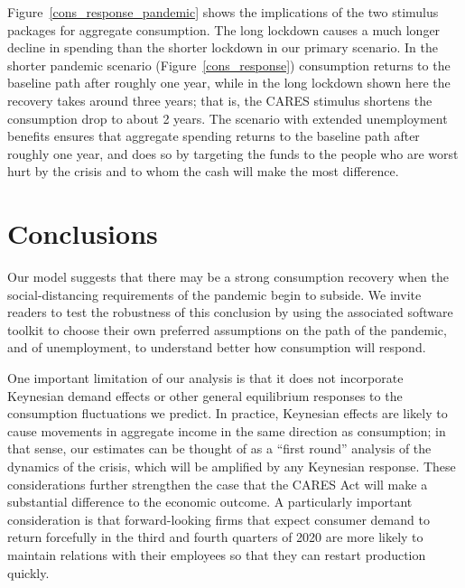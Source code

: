 \documentclass[titlepage]{\econtex}
\begin{document}
Figure~\ref{cons_response_pandemic} shows the implications of the two stimulus packages for aggregate consumption. 
The long lockdown causes a much longer decline in spending than the shorter lockdown in our primary scenario. In the shorter pandemic scenario (Figure~\ref{cons_response}) consumption returns to the baseline path after roughly one year, while in the long lockdown shown here the recovery takes around three years; that is,
the CARES stimulus shortens the consumption drop to about 2 years.
The scenario with extended unemployment benefits ensures that aggregate spending returns to the baseline path after roughly one year, and does so by targeting the funds to the people who are worst hurt by the crisis and to whom the cash will make the most difference.  

\section{Conclusions}

Our model suggests that there may be a strong consumption recovery when the social-distancing requirements of the pandemic begin to subside.
We invite readers to test the robustness of this conclusion by using the associated software toolkit to choose their own preferred assumptions on the path of the pandemic, and of unemployment, to understand better how consumption will respond.

One important limitation of our analysis is that it does not incorporate Keynesian demand effects or other general equilibrium responses to the consumption fluctuations we predict.
In practice, Keynesian effects are likely to cause movements in aggregate income in the same direction as consumption; in that sense, our estimates can be thought of as a ``first round'' analysis of the dynamics of the crisis, which will be amplified by any Keynesian response.
These considerations further strengthen the case that the CARES Act will make a substantial difference to the economic outcome.
A particularly important consideration is that forward-looking firms that expect consumer demand to return forcefully in the third and fourth quarters of 2020 are more likely to maintain relations with their employees so that they can restart production quickly.
\end{document}
